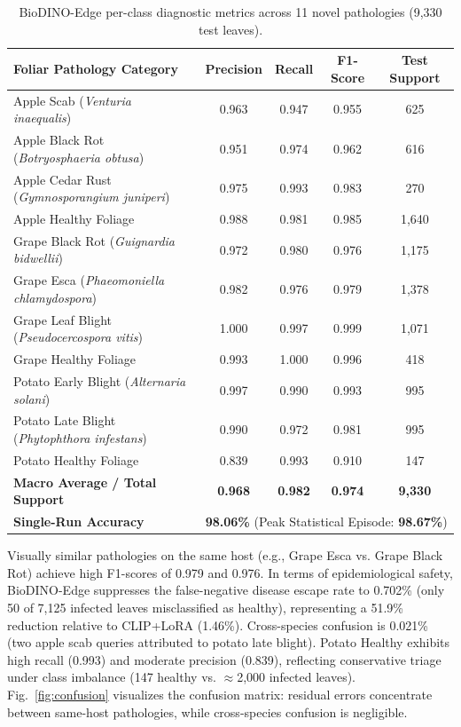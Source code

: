 \documentclass[preprint,12pt]{elsarticle}
\begin{document}
\begin{table}[htbp]
\centering
\caption{BioDINO-Edge per-class diagnostic metrics across 11 novel pathologies (9,330 test leaves).}
\label{tab:per_class}
\footnotesize
\setlength{\tabcolsep}{5pt}
\begin{tabularx}{\textwidth}{lcccc}
\toprule
\textbf{Foliar Pathology Category} & \textbf{Precision} & \textbf{Recall} & \textbf{F1-Score} & \textbf{Test Support} \\
\midrule
Apple Scab (\textit{Venturia inaequalis}) & 0.963 & 0.947 & 0.955 & 625 \\
Apple Black Rot (\textit{Botryosphaeria obtusa}) & 0.951 & 0.974 & 0.962 & 616 \\
Apple Cedar Rust (\textit{Gymnosporangium juniperi}) & 0.975 & 0.993 & 0.983 & 270 \\
Apple Healthy Foliage & 0.988 & 0.981 & 0.985 & 1,640 \\
\midrule
Grape Black Rot (\textit{Guignardia bidwellii}) & 0.972 & 0.980 & 0.976 & 1,175 \\
Grape Esca (\textit{Phaeomoniella chlamydospora}) & 0.982 & 0.976 & 0.979 & 1,378 \\
Grape Leaf Blight (\textit{Pseudocercospora vitis}) & 1.000 & 0.997 & 0.999 & 1,071 \\
Grape Healthy Foliage & 0.993 & 1.000 & 0.996 & 418 \\
\midrule
Potato Early Blight (\textit{Alternaria solani}) & 0.997 & 0.990 & 0.993 & 995 \\
Potato Late Blight (\textit{Phytophthora infestans}) & 0.990 & 0.972 & 0.981 & 995 \\
Potato Healthy Foliage & 0.839 & 0.993 & 0.910 & 147 \\
\midrule
\textbf{Macro Average / Total Support} & \textbf{0.968} & \textbf{0.982} & \textbf{0.974} & \textbf{9,330} \\
\textbf{Single-Run Accuracy} & \multicolumn{4}{c}{\textbf{98.06\%} (Peak Statistical Episode: \textbf{98.67\%})} \\
\bottomrule
\end{tabularx}
\end{table}

Visually similar pathologies on the same host (e.g., Grape Esca vs. Grape Black Rot) achieve high F1-scores of 0.979 and 0.976. In terms of epidemiological safety, BioDINO-Edge suppresses the false-negative disease escape rate to 0.702\% (only 50 of 7,125 infected leaves misclassified as healthy), representing a 51.9\% reduction relative to CLIP+LoRA (1.46\%). Cross-species confusion is 0.021\% (two apple scab queries attributed to potato late blight). Potato Healthy exhibits high recall (0.993) and moderate precision (0.839), reflecting conservative triage under class imbalance (147 healthy vs. $\approx$2,000 infected leaves). Fig.~\ref{fig:confusion} visualizes the confusion matrix: residual errors concentrate between same-host pathologies, while cross-species confusion is negligible.
\end{document}
